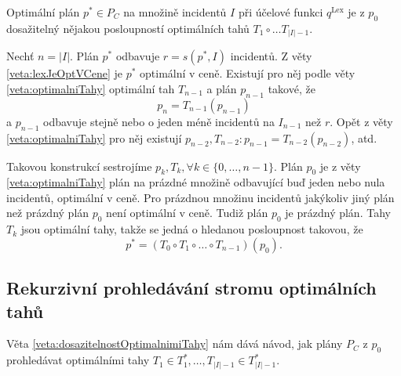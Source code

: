 \begin{veta}\label{veta:dosazitelnostOptimalnimiTahy}
  Optimální plán $p^* \in P_C$ na množině incidentů $I$ při účelové funkci $q^{\text{Lex}}$ je z $p_0$ dosažitelný nějakou posloupností optimálních tahů $T_1 \circ \dots T_{|I|-1}$.
\end{veta}
\begin{dukaz}
  Nechť $n = |I|$.
  Plán $p^*$ odbavuje $r = s(p^*, I)$ incidentů.
  Z věty \ref{veta:lexJeOptVCene} je $p^*$ optimální v ceně.
  Existují pro něj podle věty \ref{veta:optimalniTahy} optimální tah $T_{n-1}$ a plán $p_{n-1}$ takové, že
  \begin{equation*}
    p_n = T_{n-1}(p_{n-1})
  \end{equation*}
  a $p_{n-1}$ odbavuje stejně nebo o jeden méně incidentů na $I_{n-1}$ než $r$.
  Opět z věty \ref{veta:optimalniTahy} pro něj existují $p_{n-2}, T_{n-2} \colon p_{n-1} = T_{n-2}(p_{n-2})$, atd.\

  Takovou konstrukcí sestrojíme $p_{k}, T_{k}, \forall k \in \{ 0, \dots, n-1 \}$. 
  Plán $p_0$ je z věty \ref{veta:optimalniTahy} plán na prázdné množině odbavující buď jeden nebo nula incidentů, optimální v ceně.
  Pro prázdnou množinu incidentů jakýkoliv jiný plán než prázdný plán $p_0$ není optimální v ceně.
  Tudiž plán $p_0$ je prázdný plán.
  Tahy $T_k$ jsou optimální tahy, takže se jedná o hledanou posloupnost takovou, že
  \begin{equation*}
    p^* = (T_0 \circ T_1 \circ \dots \circ T_{n-1})(p_0).
  \end{equation*}
\end{dukaz}

\subsection{Rekurzivní prohledávání stromu optimálních tahů}

Věta \ref{veta:dosazitelnostOptimalnimiTahy} nám dává návod, jak plány $P_C$ z $p_0$ prohledávat optimálními tahy $T_1 \in T^*_1, \dots , T_{|I| - 1} \in T^*_{|I|-1}$.


